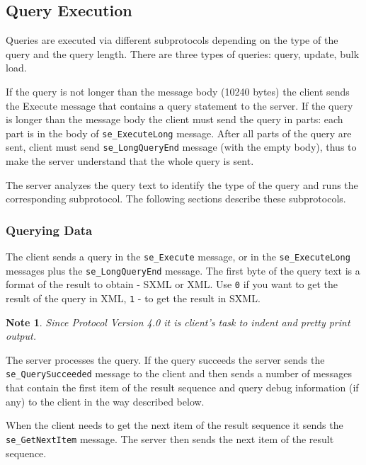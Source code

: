 \documentclass[a4paper,12pt]{article}
\newtheorem{note}{Note}    %
\begin{document}
\subsection{Query Execution}

Queries are executed via different subprotocols depending on the type of the
query and the query length. There are three types of queries: query, update,
bulk load.

If the query is not longer than the message body (10240 bytes) the client sends
the Execute message that contains a query statement to the server. If the query
is longer than the message body the client must send the query in parts: each
part is in the body of \verb!se_ExecuteLong! message. After all parts of the
query are sent, client must send \verb!se_LongQueryEnd! message (with the empty
body), thus to make the server understand that the whole query is sent.

The server analyzes the query text to identify the type of the query and runs
the corresponding subprotocol. The following sections describe these
subprotocols.

\subsubsection{Querying Data }

The client sends a query in the \verb!se_Execute! message, or in the
\verb!se_ExecuteLong! messages plus the \verb!se_LongQueryEnd! message. The
first byte of the query text is a format of the result to obtain - SXML
\cite{paper:sxml} or XML. Use \verb!0! if you want to get the result of the
query in XML, \verb!1! - to get the result in SXML.

\begin{note}
Since Protocol Version 4.0 it is client's task to indent and pretty print
output.
\end{note}

The server processes the query. If the query succeeds the server sends the
\verb!se_QuerySucceeded! message to the client and then sends a number of
messages that contain the first item of the result sequence and query debug
information (if any) to the client in the way described below.

When the client needs to get the next item of the result sequence it sends the
\verb!se_GetNextItem! message. The server then sends the next item of the result
sequence.
\end{document}
